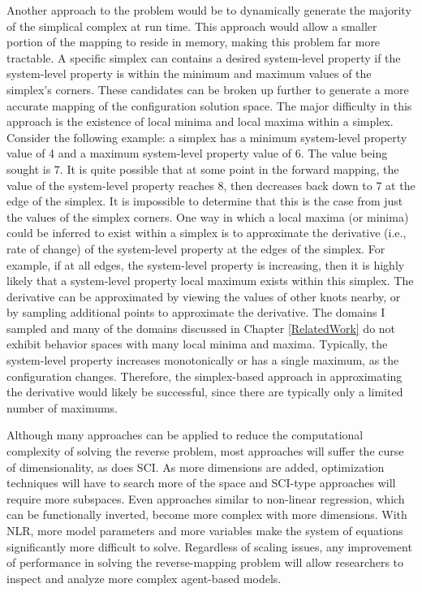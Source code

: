 Another approach to the problem would be to dynamically generate the majority of the simplical complex at run time.
This approach would allow a smaller portion of the mapping to reside in memory, making this problem far more tractable.
A specific simplex can contains a desired system-level property if the system-level property is within the minimum and maximum values of the simplex's corners.
These candidates can be broken up further to generate a more accurate mapping of the configuration solution space.
The major difficulty in this approach is the existence of local minima and local maxima within a simplex.
Consider the following example: a simplex has a minimum system-level property value of 4 and a maximum system-level property value of 6.
The value being sought is 7.
It is quite possible that at some point in the forward mapping, the value of the system-level property reaches 8, then decreases back down to 7 at the edge of the simplex.
It is impossible to determine that this is the case from just the values of the simplex corners.
One way in which a local maxima (or minima) could be inferred to exist within a simplex is to approximate the derivative (i.e., rate of change) of the system-level property at the edges of the simplex.
For example, if at all edges, the system-level property is increasing, then it is highly likely that a system-level property local maximum exists within this simplex.
The derivative can be approximated by viewing the values of other knots nearby, or by sampling additional points to approximate the derivative.
The domains I sampled and many of the domains discussed in Chapter \ref{RelatedWork} do not exhibit behavior spaces with many local minima and maxima.
Typically, the system-level property increases monotonically or has a single maximum, as the configuration changes.
Therefore, the simplex-based approach in approximating the derivative would likely be successful, since there are typically  only a limited number of maximums.

Although many approaches can be applied to reduce the computational complexity of solving the reverse problem, most approaches will suffer the curse of dimensionality, as does SCI.
As more dimensions are added, optimization techniques will have to search more of the space and SCI-type approaches will require more subspaces.
Even approaches similar to non-linear regression, which can be functionally inverted, become more complex with more dimensions.
With NLR, more model parameters and more variables make the system of equations significantly more difficult to solve.
Regardless of scaling issues, any improvement of performance in solving the reverse-mapping problem will allow researchers to inspect and analyze more complex agent-based models.

